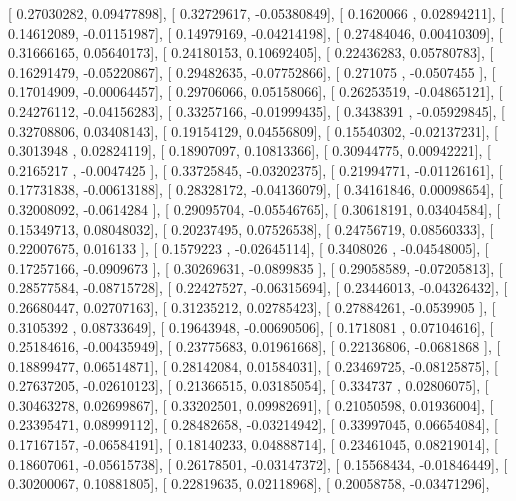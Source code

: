 \documentclass{article}
\begin{document}
       [ 0.27030282,  0.09477898],
       [ 0.32729617, -0.05380849],
       [ 0.1620066 ,  0.02894211],
       [ 0.14612089, -0.01151987],
       [ 0.14979169, -0.04214198],
       [ 0.27484046,  0.00410309],
       [ 0.31666165,  0.05640173],
       [ 0.24180153,  0.10692405],
       [ 0.22436283,  0.05780783],
       [ 0.16291479, -0.05220867],
       [ 0.29482635, -0.07752866],
       [ 0.271075  , -0.0507455 ],
       [ 0.17014909, -0.00064457],
       [ 0.29706066,  0.05158066],
       [ 0.26253519, -0.04865121],
       [ 0.24276112, -0.04156283],
       [ 0.33257166, -0.01999435],
       [ 0.3438391 , -0.05929845],
       [ 0.32708806,  0.03408143],
       [ 0.19154129,  0.04556809],
       [ 0.15540302, -0.02137231],
       [ 0.3013948 ,  0.02824119],
       [ 0.18907097,  0.10813366],
       [ 0.30944775,  0.00942221],
       [ 0.2165217 , -0.0047425 ],
       [ 0.33725845, -0.03202375],
       [ 0.21994771, -0.01126161],
       [ 0.17731838, -0.00613188],
       [ 0.28328172, -0.04136079],
       [ 0.34161846,  0.00098654],
       [ 0.32008092, -0.0614284 ],
       [ 0.29095704, -0.05546765],
       [ 0.30618191,  0.03404584],
       [ 0.15349713,  0.08048032],
       [ 0.20237495,  0.07526538],
       [ 0.24756719,  0.08560333],
       [ 0.22007675,  0.016133  ],
       [ 0.1579223 , -0.02645114],
       [ 0.3408026 , -0.04548005],
       [ 0.17257166, -0.0909673 ],
       [ 0.30269631, -0.0899835 ],
       [ 0.29058589, -0.07205813],
       [ 0.28577584, -0.08715728],
       [ 0.22427527, -0.06315694],
       [ 0.23446013, -0.04326432],
       [ 0.26680447,  0.02707163],
       [ 0.31235212,  0.02785423],
       [ 0.27884261, -0.0539905 ],
       [ 0.3105392 ,  0.08733649],
       [ 0.19643948, -0.00690506],
       [ 0.1718081 ,  0.07104616],
       [ 0.25184616, -0.00435949],
       [ 0.23775683,  0.01961668],
       [ 0.22136806, -0.0681868 ],
       [ 0.18899477,  0.06514871],
       [ 0.28142084,  0.01584031],
       [ 0.23469725, -0.08125875],
       [ 0.27637205, -0.02610123],
       [ 0.21366515,  0.03185054],
       [ 0.334737  ,  0.02806075],
       [ 0.30463278,  0.02699867],
       [ 0.33202501,  0.09982691],
       [ 0.21050598,  0.01936004],
       [ 0.23395471,  0.08999112],
       [ 0.28482658, -0.03214942],
       [ 0.33997045,  0.06654084],
       [ 0.17167157, -0.06584191],
       [ 0.18140233,  0.04888714],
       [ 0.23461045,  0.08219014],
       [ 0.18607061, -0.05615738],
       [ 0.26178501, -0.03147372],
       [ 0.15568434, -0.01846449],
       [ 0.30200067,  0.10881805],
       [ 0.22819635,  0.02118968],
       [ 0.20058758, -0.03471296],
\end{document}
